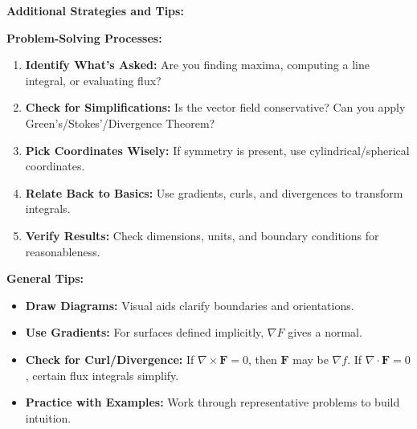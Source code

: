 \documentclass[9pt]{article}
\begin{document}
\begin{multicols}{2}
\footnotesize

\noindent \textbf{Additional Strategies and Tips:}

\begin{tcolorbox}[title=, colframe=brightpink]
\textbf{Problem-Solving Processes:}
\begin{enumerate}
    \item \textbf{Identify What’s Asked:} Are you finding maxima, computing a line integral, or evaluating flux?
    \item \textbf{Check for Simplifications:} Is the vector field conservative? Can you apply Green’s/Stokes’/Divergence Theorem?
    \item \textbf{Pick Coordinates Wisely:} If symmetry is present, use cylindrical/spherical coordinates.
    \item \textbf{Relate Back to Basics:} Use gradients, curls, and divergences to transform integrals.
    \item \textbf{Verify Results:} Check dimensions, units, and boundary conditions for reasonableness.
\end{enumerate}
\end{tcolorbox}

\begin{tcolorbox}[title=, colframe=brightyellow]
\textbf{General Tips:}
\begin{itemize}
    \item \textbf{Draw Diagrams:} Visual aids clarify boundaries and orientations.
    \item \textbf{Use Gradients:} For surfaces defined implicitly, $\nabla F$ gives a normal.
    \item \textbf{Check for Curl/Divergence:} If $\nabla\times\mathbf{F}=0$, then $\mathbf{F}$ may be $\nabla f$. If $\nabla\cdot\mathbf{F}=0$, certain flux integrals simplify.
    \item \textbf{Practice with Examples:} Work through representative problems to build intuition.
\end{itemize}
\end{tcolorbox}

\end{multicols}
\end{document}
